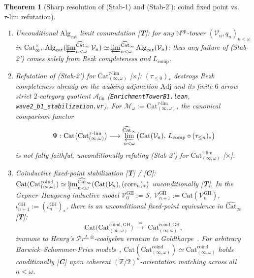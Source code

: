 \documentclass[11pt]{article}
\theoremstyle{plain}
\newtheorem{theorem}{Theorem}[section]
\theoremstyle{definition}
\newcommand{\Cat}{\mathrm{Cat}}
\begin{document}
\begin{theorem}[Sharp resolution of \textup{(Stab-1)} and \textup{(Stab-2')}: $\mathrm{coind}$ fixed point vs.\ $\tau\text{-}\mathrm{lim}$ refutation]\label{thm:b1-stab-resolution}
\begin{enumerate}[nosep,label=(\roman*)]
\item \emph{Unconditional $\mathrm{Alg}_{\mathrm{cat}}$ limit commutation \textup{[\textbf{T}]}}: for any $\mathbb{N}^{\mathrm{op}}$-tower $(\mathcal{V}_n, q_n)_{n<\omega}$ in $\Cat_\infty^{\times}$, $\mathrm{Alg}_{\mathrm{cat}}(\varprojlim_{n<\omega}^{\widehat{\Cat}_\infty} \mathcal{V}_n) \simeq \varprojlim_{n<\omega}^{\widehat{\Cat}_\infty} \mathrm{Alg}_{\mathrm{cat}}(\mathcal{V}_n)$; thus any failure of \textup{(Stab-2')} comes solely from Rezk completeness and $L_{\mathrm{comp}}$.
\item \emph{Refutation of \textup{(Stab-2')} for $\Cat_{(\infty,\omega)}^{\tau\text{-}\mathrm{lim}}$ \textup{[\textbf{$\times$}]}}: $(\tau_{\le 0})_*$ destroys Rezk completeness already on the walking adjunction $\mathrm{Adj}$ and its finite $6$-arrow strict $2$-category quotient $\mathcal{A}_{\mathrm{fin}}$ (\texttt{EnrichmentTowerB1.lean}, \texttt{wave2\_b1\_stabilization.vr}). For $\mathcal{M}_\omega := \Cat_{(\infty,\omega)}^{\tau\text{-}\mathrm{lim}}$, the canonical comparison functor
\[
  \Psi : \Cat\bigl(\Cat_{(\infty,\omega)}^{\tau\text{-}\mathrm{lim}}\bigr) \longrightarrow \varprojlim_{n < \omega}^{\widehat{\Cat}_\infty} \bigl(\Cat(\mathcal{V}_n),\, L_{\mathrm{comp}} \circ (\tau_{\le n})_*\bigr)
\]
is \emph{not} fully faithful, unconditionally refuting \textup{(Stab-2')} for $\Cat_{(\infty,\omega)}^{\tau\text{-}\mathrm{lim}}$ \textup{[\textbf{$\times$}]}.
\item \emph{Coinductive fixed-point stabilization \textup{[\textbf{T}]} / \textup{[\textbf{C}]}}: $\Cat(\Cat_{(\infty,\omega)}^{\mathrm{coind}}) \simeq \varprojlim_{n<\omega}^{\widehat{\Cat}_\infty}(\Cat(\mathcal{V}_n), (\mathrm{core}_n)_*)$ unconditionally \textup{[\textbf{T}]}. In the Gepner--Haugseng inductive model $\mathcal{V}_0^{\mathrm{GH}} := \mathcal{S}$, $\mathcal{V}_{n+1}^{\mathrm{GH}} := \Cat(\mathcal{V}_n^{\mathrm{GH}})$, $\iota_{n+1}^{\mathrm{GH}} := (\iota_n^{\mathrm{GH}})_*$, there is an unconditional fixed-point equivalence in $\widehat{\Cat}_\infty$ \textup{[\textbf{T}]}:
\[
  \Cat\bigl(\Cat_{(\infty,\omega)}^{\mathrm{coind, GH}}\bigr) \;\xrightarrow{\;\simeq\;}\; \Cat_{(\infty,\omega)}^{\mathrm{coind, GH}},
\]
immune to Henry's $\mathcal{P}r^{L,\otimes}$-coalgebra erratum to Goldthorpe~\cite{Goldthorpe2023}. For arbitrary Barwick--Schommer-Pries models~\cite{BarwickSchommerPries2021}, $\Cat(\Cat_{(\infty,\omega)}^{\mathrm{coind}}) \simeq \Cat_{(\infty,\omega)}^{\mathrm{coind}}$ holds conditionally \textup{[\textbf{C}]} upon coherent $(\mathbb{Z}/2)^n$-orientation matching across all $n < \omega$.

\end{enumerate}
\end{theorem}
\end{document}
